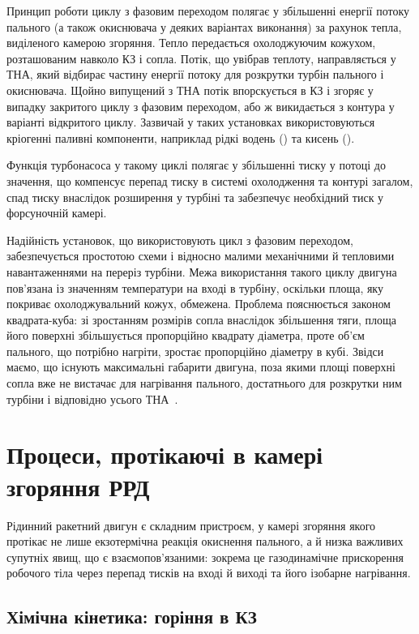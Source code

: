 Принцип роботи циклу з фазовим переходом полягає у збільшенні енергії потоку пального (а також окиснювача у деяких варіантах виконання) за рахунок тепла, виділеного камерою згоряння. Тепло передається охолоджуючим кожухом, розташованим навколо КЗ і сопла. Потік, що увібрав теплоту, направляється у ТНА, який відбирає частину енергії потоку для розкрутки турбін пального і окиснювача. Щойно випущений з ТНА потік впорскується в КЗ і згоряє у випадку закритого циклу з фазовим переходом, або ж викидається з контура у варіанті відкритого циклу. Зазвичай у таких установках використовуються кріогенні паливні компоненти, наприклад рідкі водень () та кисень ().

Функція турбонасоса у такому циклі полягає у збільшенні тиску у потоці до значення, що компенсує перепад тиску в системі охолодження та контурі загалом, спад тиску внаслідок розширення у турбіні та забезпечує необхідний тиск у форсуночній камері. 

Надійність установок, що використовують цикл з фазовим переходом, забезпечується простотою схеми і відносно малими механічними й тепловими навантаженнями на переріз турбіни. Межа використання такого циклу двигуна пов'язана із значенням температури на вході в турбіну, оскільки площа, яку покриває охолоджувальний кожух, обмежена. Проблема пояснюється законом квадрата-куба: зі зростанням розмірів сопла внаслідок збільшення тяги, площа його поверхні збільшується пропорційно квадрату діаметра, проте об'єм пального, що потрібно нагріти, зростає пропорційно діаметру в кубі. Звідси маємо, що існують максимальні габарити двигуна, поза якими площі поверхні сопла вже не вистачає для нагрівання пального, достатнього для розкрутки ним турбіни і відповідно усього ТНА~\cite[с. 5 -- 6]{Cantiani}.


\section{Процеси, протікаючі в камері згоряння РРД}

Рідинний ракетний двигун є складним пристроєм, у камері згоряння якого протікає не лише екзотермічна реакція окиснення пального, а й низка важливих супутніх явищ, що є взаємопов'язаними: зокрема це газодинамічне прискорення робочого тіла через перепад тисків на вході й виході та його ізобарне нагрівання.

\subsection{Хімічна кінетика: горіння в КЗ}

